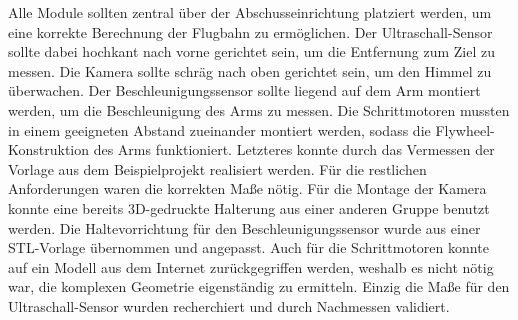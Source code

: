 Alle Module sollten zentral über der Abschusseinrichtung platziert werden, um eine korrekte Berechnung der Flugbahn zu ermöglichen. Der Ultraschall-Sensor sollte dabei hochkant nach vorne gerichtet sein, um die Entfernung zum Ziel zu messen. Die Kamera sollte schräg nach oben gerichtet sein, um den Himmel zu überwachen. Der Beschleunigungssensor sollte liegend auf dem Arm montiert werden, um die Beschleunigung des Arms zu messen. Die Schrittmotoren mussten in einem geeigneten Abstand zueinander montiert werden, sodass die Flywheel-Konstruktion des Arms funktioniert. Letzteres konnte durch das Vermessen der Vorlage aus dem Beispielprojekt realisiert werden. Für die restlichen Anforderungen waren die korrekten Maße nötig. Für die Montage der Kamera konnte eine bereits 3D-gedruckte Halterung aus einer anderen Gruppe benutzt werden. Die Haltevorrichtung für den Beschleunigungssensor wurde aus einer STL-Vorlage übernommen und angepasst. Auch für die Schrittmotoren konnte auf ein Modell aus dem Internet zurückgegriffen werden, weshalb es nicht nötig war, die komplexen Geometrie eigenständig zu ermitteln. Einzig die Maße für den Ultraschall-Sensor wurden recherchiert und durch Nachmessen validiert.

